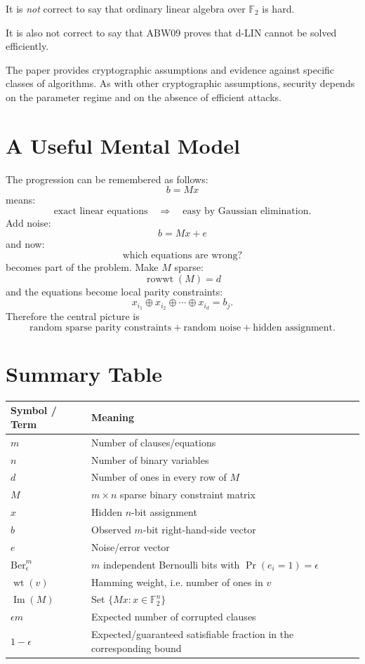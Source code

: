 \documentclass[11pt,a4paper]{article}
\newcommand{\F}{\mathbb{F}}
\newcommand{\wt}{\operatorname{wt}}
\newcommand{\Image}{\operatorname{Im}}
\newcommand{\Ber}{\mathrm{Ber}}
\newcommand{\Prob}{\Pr}
\begin{document}
It is \emph{not} correct to say that ordinary linear algebra over
$\F_2$ is hard.

It is also not correct to say that ABW09 proves that d-LIN cannot be
solved efficiently.

The paper provides cryptographic assumptions and evidence against
specific classes of algorithms. As with other cryptographic
assumptions, security depends on the parameter regime and on the
absence of efficient attacks.

\section{A Useful Mental Model}

The progression can be remembered as follows: \[
\boxed{
b=Mx
}
\] means:\[
\text{exact linear equations}
\quad\Longrightarrow\quad
\text{easy by Gaussian elimination}.
\]Add noise: \[
\boxed{
b=Mx+e
}
\] and now:
\[
\text{which equations are wrong?}
\]
becomes part of the problem. 
Make $M$ sparse:
\[
\boxed{
\operatorname{rowwt}(M)=d
}
\]
and the equations become local parity constraints:
\[
x_{i_1}\oplus x_{i_2}\oplus\cdots\oplus x_{i_d}=b_j.
\]
Therefore the central picture is
\[
\boxed{
\text{random sparse parity constraints}
+
\text{random noise}
+
\text{hidden assignment}.
}
\]

\section{Summary Table}

\begin{center}
\begin{tabular}{p{}p{}}
\toprule
Symbol / Term & Meaning\\
\midrule
$m$ & Number of clauses/equations\\
$n$ & Number of binary variables\\
$d$ & Number of ones in every row of $M$\\
$M$ & $m\times n$ sparse binary constraint matrix\\
$x$ & Hidden $n$-bit assignment\\
$b$ & Observed $m$-bit right-hand-side vector\\
$e$ & Noise/error vector\\
$\Ber_\epsilon^m$ & $m$ independent Bernoulli bits with $\Prob(e_i=1)=\epsilon$\\
$\wt(v)$ & Hamming weight, i.e. number of ones in $v$\\
$\Image(M)$ & Set $\{Mx:x\in\F_2^n\}$\\
$\epsilon m$ & Expected number of corrupted clauses\\
$1-\epsilon$ & Expected/guaranteed satisfiable fraction in the corresponding bound\\
\bottomrule
\end{tabular}
\end{center}
\end{document}
